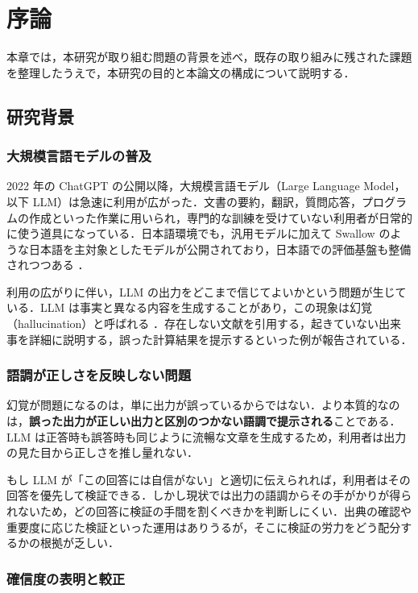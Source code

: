 \chapter{序論}

本章では，本研究が取り組む問題の背景を述べ，既存の取り組みに残された課題を整理したうえで，本研究の目的と本論文の構成について説明する．

\section{研究背景}

\subsection{大規模言語モデルの普及}

2022 年の ChatGPT の公開以降，大規模言語モデル（Large Language Model，以下 LLM）は急速に利用が広がった．文書の要約，翻訳，質問応答，プログラムの作成といった作業に用いられ，専門的な訓練を受けていない利用者が日常的に使う道具になっている．日本語環境でも，汎用モデルに加えて Swallow \cite{fujii2024swallow} のような日本語を主対象としたモデルが公開されており，日本語での評価基盤も整備されつつある \cite{llmjpeval2024}．

利用の広がりに伴い，LLM の出力をどこまで信じてよいかという問題が生じている．LLM は事実と異なる内容を生成することがあり，この現象は幻覚（hallucination）と呼ばれる \cite{ji2023hallucination,huang2023hallucination}．存在しない文献を引用する，起きていない出来事を詳細に説明する，誤った計算結果を提示するといった例が報告されている．

\subsection{語調が正しさを反映しない問題}

幻覚が問題になるのは，単に出力が誤っているからではない．より本質的なのは，\textbf{誤った出力が正しい出力と区別のつかない語調で提示される}ことである．LLM は正答時も誤答時も同じように流暢な文章を生成するため，利用者は出力の見た目から正しさを推し量れない．

もし LLM が「この回答には自信がない」と適切に伝えられれば，利用者はその回答を優先して検証できる．しかし現状では出力の語調からその手がかりが得られないため，どの回答に検証の手間を割くべきかを判断しにくい．出典の確認や重要度に応じた検証といった運用はありうるが，そこに検証の労力をどう配分するかの根拠が乏しい．

\subsection{確信度の表明と較正}

